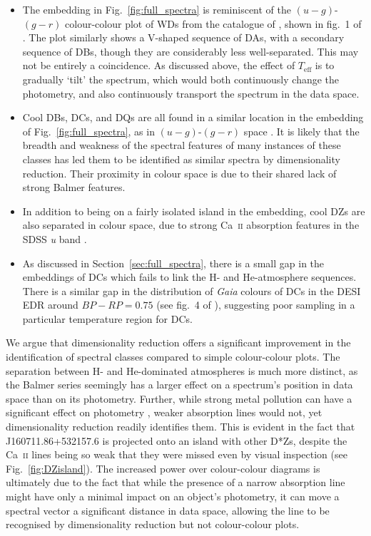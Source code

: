 \documentclass[fleqn,usenatbib]{mnras}
\def\Teff{T_\mathrm{eff}}
\begin{document}
\begin{itemize}
\item
The embedding in Fig.~\ref{fig:full_spectra} is reminiscent of the $(u-g)$-$(g-r)$ colour-colour plot of WDs from the catalogue of \citet{gentilefusillo19}, shown in fig.~1 of \citet{manser20}.
The plot similarly shows a V-shaped sequence of DAs, with a secondary sequence of DBs, though they are considerably less well-separated.
This may not be entirely a coincidence.
As discussed above, the effect of $\Teff$ is to gradually `tilt' the spectrum, which would both continuously change the photometry, and also continuously transport the spectrum in the data space.
\item
Cool DBs, DCs, and DQs are all found in a similar location in the embedding of Fig.~\ref{fig:full_spectra}, as in $(u-g)$-$(g-r)$ space \citep{manser20}.
It is likely that the breadth and weakness of the spectral features of many instances of these classes has led them to be identified as similar spectra by dimensionality reduction.
Their proximity in colour space is due to their shared lack of strong Balmer features.
\item
In addition to being on a fairly isolated island in the embedding, cool DZs are also separated in colour space, due to strong Ca~\textsc{ii} absorption features in the SDSS \textit{u} band \citep{hollands15}.
\item
As discussed in Section~\ref{sec:full_spectra}, there is a small gap in the embeddings of DCs which fails to link the H- and He-atmosphere sequences.
There is a similar gap in the distribution of \textit{Gaia} colours of DCs in the DESI EDR around $\mathit{BP}-\mathit{RP}=0.75$ (see fig.~4 of \citealt{manser24}), suggesting poor sampling in a particular temperature region for DCs.
\end{itemize}

We argue that dimensionality reduction offers a significant improvement in the identification of spectral classes compared to simple colour-colour plots.
The separation between H- and He-dominated atmospheres is much more distinct, as the Balmer series seemingly has a larger effect on a spectrum's position in data space than on its photometry.
Further, while strong metal pollution can have a significant effect on photometry \citep{hollands15}, weaker absorption lines would not, yet dimensionality reduction readily identifies them.
This is evident in the fact that J160711.86+532157.6 is projected onto an island with other D*Zs, despite the Ca~\textsc{ii} lines being so weak that they were missed even by visual inspection (see Fig.~\ref{fig:DZisland}).
The increased power over colour-colour diagrams is ultimately due to the fact that while the presence of a narrow absorption line might have only a minimal impact on an object's photometry, it can move a spectral vector a significant distance in data space, allowing the line to be recognised by dimensionality reduction but not colour-colour plots.
\end{document}
